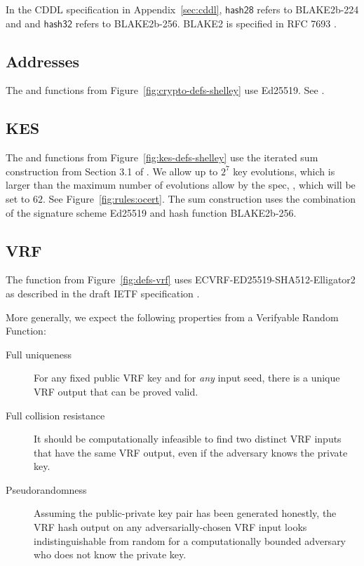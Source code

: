 In the CDDL specification in Appendix~\ref{sec:cddl},
$\mathsf{hash28}$ refers to BLAKE2b-224 and
and $\mathsf{hash32}$ refers to BLAKE2b-256.
BLAKE2 is specified in RFC 7693 \cite{rfcBLAKE2}.

\subsection{Addresses}
\label{sec:app-addresses}
The  and  functions from Figure~\ref{fig:crypto-defs-shelley}
use Ed25519. See \cite{rfcEdDSA}.

\subsection{KES}
The  and  functions from Figure~\ref{fig:kes-defs-shelley}
use the iterated sum construction from Section 3.1 of \cite{cryptoeprint:2001:034}.
We allow up to $2^7$ key evolutions, which is larger than the maximum number
of evolutions allow by the spec, \MaxKESEvo, which will be set to $62$.
See Figure~\ref{fig:rules:ocert}.
The sum construction uses the combination of the signature scheme Ed25519 and
hash function BLAKE2b-256.

\subsection{VRF}
\label{sec:app-vrf}
The  function from Figure~\ref{fig:defs-vrf}
uses ECVRF-ED25519-SHA512-Elligator2 as described in the draft IETF specification
\cite{rfcVRFDraft}.

More generally, we expect the following properties from a Verifyable Random Function: 
\begin{description}
\item[Full uniqueness] For any fixed public VRF key and for \textit{any} input seed, there is a unique VRF output that can be proved valid. 
\item[Full collision resistance] It should be computationally infeasible to find two distinct VRF inputs that have the same VRF output, even if the adversary knows the private key. 
\item[Pseudorandomness] Assuming the public-private key pair has been generated honestly, the VRF hash output on any adversarially-chosen VRF input looks indistinguishable from random for a computationally bounded adversary who does not know the private key. 
\end{description}

